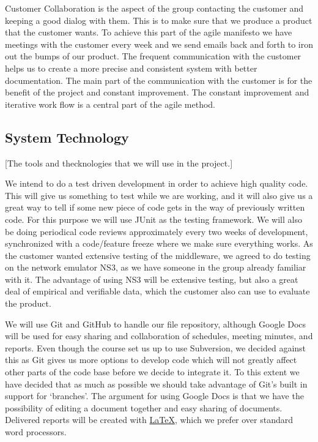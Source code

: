     Customer Collaboration is the aspect of the group contacting the customer and keeping a good dialog with them. This is to make sure that we produce a product that the customer wants. To achieve this part of the agile manifesto we have meetings with the customer every week and we send emails back and forth to iron out the bumps of our product. The frequent communication with the customer helps us to create a more precise and consistent system with better documentation. The main part of the communication with the customer is for the benefit of the project and constant improvement. The constant improvement and iterative work flow is a central part of the agile method. 

    \subsection{System Technology}\label{tools} [The tools and thecknologies that we will use in the project.]
    
    We  intend to do a test driven development in order to achieve high quality code. This will give us something to test while we are working, and it will also give us a great way to tell if some new piece of code gets in the way of previously written code. For this purpose we will use JUnit as the testing framework. We will also be doing periodical code reviews approximately every two weeks of development, synchronized with a code/feature freeze where we make sure everything works. As the customer wanted extensive testing of the middleware, we agreed to do testing on the network emulator NS3, as we have someone in the group already familiar with it. The advantage of using NS3 will be extensive testing, but also a great deal of empirical and verifiable data, which the customer also can use to evaluate the product.

    We will use Git and GitHub to handle our file repository, although Google Docs will be used for easy sharing and collaboration of schedules, meeting minutes, and reports. Even though the course set us up to use Subversion, we decided against this as Git gives us more options to develop code which will not greatly affect other parts of the code base before we decide to integrate it. To this extent we have decided that as much as possible we should take advantage of Git’s built in support for ‘branches’. The argument for using Google Docs is that we have the possibility of editing a document together and easy sharing of documents. Delivered reports will be created with \href{http://www.latex-project.org/}{\LaTeX}, which we prefer over standard word processors.

